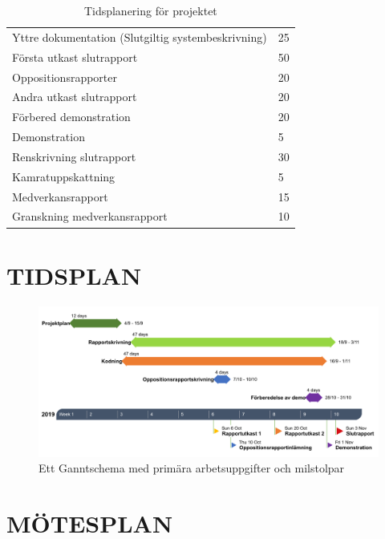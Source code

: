 \documentclass[a4paper]{article}
\begin{document}
\begin{table}[b]
\begin{tabular}{|l|l|}
Yttre dokumentation (Slutgiltig systembeskrivning)        & 25               \\
Första utkast slutrapport                                 & 50               \\
Oppositionsrapporter                                      & 20               \\
Andra utkast slutrapport                                  & 20               \\
Förbered demonstration                                    & 20               \\
Demonstration                                             & 5               \\
Renskrivning slutrapport                                  & 30               \\
Kamratuppskattning                                        & 5                \\
Medverkansrapport                                         & 15               \\
Granskning medverkansrapport                              & 10               \\ \hline
\end{tabular}
\caption{Tidsplanering för projektet}
\label{tab:aktiviteter}
\end{table}

\section{TIDSPLAN}
\label{sec:tidsplan}

\begin{figure}[h]
	\includegraphics[width=1\textwidth]{figurer/Gantt.png}
	\caption{Ett Ganntschema med primära arbetsuppgifter och milstolpar}
	\label{fig:Gantt}
\end{figure}

\section{MÖTESPLAN}
\label{sec:mötesplan}
\end{document}
